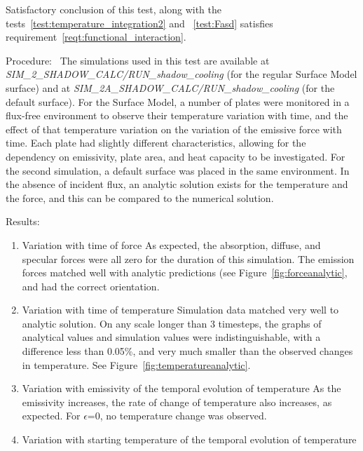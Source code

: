 \begin{description}
    Satisfactory conclusion of this test, along with the tests~\ref{test:temperature_integration2} and ~\ref{test:Fasd} satisfies requirement~\ref{reqt:functional_interaction}.
  \item{Procedure:}\ \newline
    The simulations used in this test are available at \textit{SIM\_2\_SHADOW\_CALC/RUN\_shadow\_cooling} (for the regular Surface Model surface) and at \textit{SIM\_2A\_SHADOW\_CALC/RUN\_shadow\_cooling} (for the default surface).
    For the Surface Model, a number of plates were monitored in a flux-free environment to observe
    their temperature variation with time, and the effect of that temperature
    variation on the variation of the emissive force with time.  Each plate had
    slightly different characteristics, allowing for the dependency on
    emissivity, plate area, and heat capacity to be investigated.  For the second simulation, a default surface was placed in the same environment.  In the
    absence of incident flux, an analytic solution exists for the temperature
    and the force, and this can be compared to the numerical solution.
  \item{Results:}
    \begin{enumerate}
    \item{Variation with time of force}\newline
      As expected, the absorption, diffuse, and specular forces were all zero
      for the duration of this simulation.
      The emission forces matched well with analytic predictions (see Figure~\ref{fig:forceanalytic}, and had the
      correct orientation.
    \item{Variation with time of temperature}\newline
      Simulation data matched very well to analytic solution.  On any scale
      longer than 3 timesteps, the graphs of analytical values and simulation
      values were indistinguishable, with a difference less than 0.05\%, and
      very much smaller than the observed changes in temperature.  See Figure~\ref{fig:temperatureanalytic}.
    \item{Variation with emissivity of the temporal evolution of temperature}\newline
      As the emissivity increases, the rate of change of temperature also
      increases, as expected.  For $\epsilon$=0, no temperature
      change was observed.
    \item{Variation with starting temperature of the temporal evolution of temperature}\newline

\end{enumerate}
\end{description}
